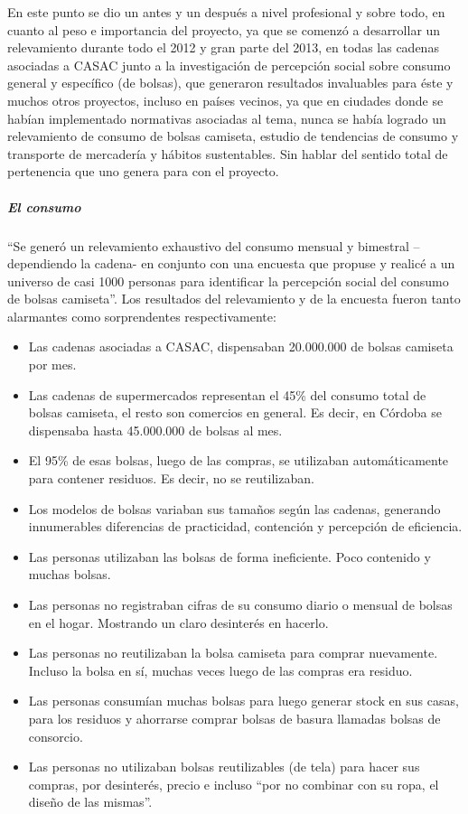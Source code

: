 \documentclass[
]{article}
\begin{document}
En este punto se dio un antes y un después a nivel profesional y sobre
todo, en cuanto al peso e importancia del proyecto, ya que se comenzó a
desarrollar un relevamiento durante todo el 2012 y gran parte del 2013,
en todas las cadenas asociadas a CASAC junto a la investigación de
percepción social sobre consumo general y específico (de bolsas), que
generaron resultados invaluables para éste y muchos otros proyectos,
incluso en países vecinos, ya que en ciudades donde se habían
implementado normativas asociadas al tema, nunca se había logrado un
relevamiento de consumo de bolsas camiseta, estudio de tendencias de
consumo y transporte de mercadería y hábitos sustentables. Sin hablar
del sentido total de pertenencia que uno genera para con el proyecto.

\hypertarget{el-consumo}{%
\subparagraph{\texorpdfstring{\textbf{El
consumo}}{El consumo}}\label{el-consumo}}

``Se generó un relevamiento exhaustivo del consumo mensual y bimestral
--dependiendo la cadena- en conjunto con una encuesta que propuse y
realicé a un universo de casi 1000 personas para identificar la
percepción social del consumo de bolsas camiseta''. Los resultados del
relevamiento y de la encuesta fueron tanto alarmantes como sorprendentes
respectivamente:

\begin{itemize}
\item
  Las cadenas asociadas a CASAC, dispensaban 20.000.000 de bolsas
  camiseta por mes.
\item
  Las cadenas de supermercados representan el 45\% del consumo total de
  bolsas camiseta, el resto son comercios en general. Es decir, en
  Córdoba se dispensaba hasta 45.000.000 de bolsas al mes.
\item
  El 95\% de esas bolsas, luego de las compras, se utilizaban
  automáticamente para contener residuos. Es decir, no se reutilizaban.
\item
  Los modelos de bolsas variaban sus tamaños según las cadenas,
  generando innumerables diferencias de practicidad, contención y
  percepción de eficiencia.
\item
  Las personas utilizaban las bolsas de forma ineficiente. Poco
  contenido y muchas bolsas.
\item
  Las personas no registraban cifras de su consumo diario o mensual de
  bolsas en el hogar. Mostrando un claro desinterés en hacerlo.
\item
  Las personas no reutilizaban la bolsa camiseta para comprar
  nuevamente. Incluso la bolsa en sí, muchas veces luego de las compras
  era residuo.
\item
  Las personas consumían muchas bolsas para luego generar stock en sus
  casas, para los residuos y ahorrarse comprar bolsas de basura llamadas
  bolsas de consorcio.
\item
  Las personas no utilizaban bolsas reutilizables (de tela) para hacer
  sus compras, por desinterés, precio e incluso ``por no combinar con su
  ropa, el diseño de las mismas''.
\end{itemize}
\end{document}

